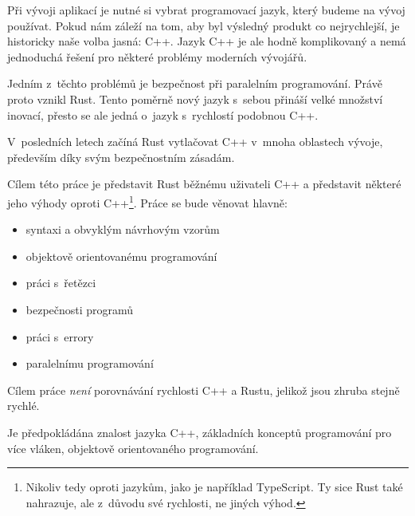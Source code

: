 \documentclass[main.tex]{subfiles}
\begin{document}


Při vývoji aplikací je nutné si vybrat programovací jazyk, který budeme na vývoj
používat. Pokud nám záleží na tom, aby byl výsledný produkt co nejrychlejší,
je historicky naše volba jasná: C++. Jazyk C++ je ale hodně komplikovaný a nemá
jednoduchá řešení pro některé problémy moderních vývojářů.

Jedním z~těchto problémů je bezpečnost při paralelním programování. Právě proto
vznikl Rust. Tento poměrně nový jazyk s~sebou přináší velké množství inovací, přesto
se ale jedná o~jazyk s~rychlostí podobnou C++.

V~posledních letech začíná Rust vytlačovat C++ v~mnoha oblastech vývoje, především
díky svým bezpečnostním zásadám.


Cílem této práce je představit Rust běžnému uživateli C++ a představit některé jeho výhody
oproti C++\footnote{Nikoliv tedy oproti jazykům, jako je například TypeScript. Ty sice
    Rust také nahrazuje, ale z~důvodu své rychlosti, ne jiných výhod.
}. Práce se bude věnovat hlavně:
\begin{itemize}
    \item syntaxi a obvyklým návrhovým vzorům
    \item objektově orientovanému programování
    \item práci s~řetězci
    \item bezpečnosti programů
    \item práci s~errory
    \item paralelnímu programování
\end{itemize}

Cílem práce \emph{není} porovnávání rychlosti C++ a Rustu, jelikož jsou zhruba stejně
rychlé.


Je předpokládána znalost jazyka C++, základních konceptů programování pro více vláken,
objektově orientovaného programování.
\end{document}
